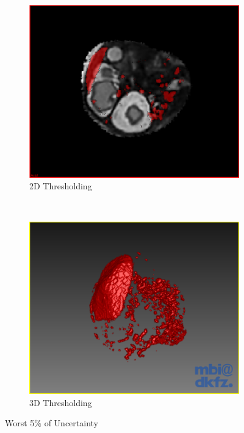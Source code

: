 \begin{figure}[H]
  \centering
  \begin{subfigure}[b]{0.4\textwidth}
    \includegraphics[width=\textwidth]{images/thresholding/thresholding_2d.png}
    \caption{2D Thresholding}\label{fig:threshold_2d}
  \end{subfigure}%
  ~ %
  \begin{subfigure}[b]{0.4\textwidth}
    \includegraphics[width=\textwidth]{images/thresholding/thresholding_3d.png}
    \caption{3D Thresholding}\label{fig:threshold_3d}
  \end{subfigure}
  \caption{Worst 5$\%$ of Uncertainty}\label{fig:threshold_settings_result}
\end{figure}

